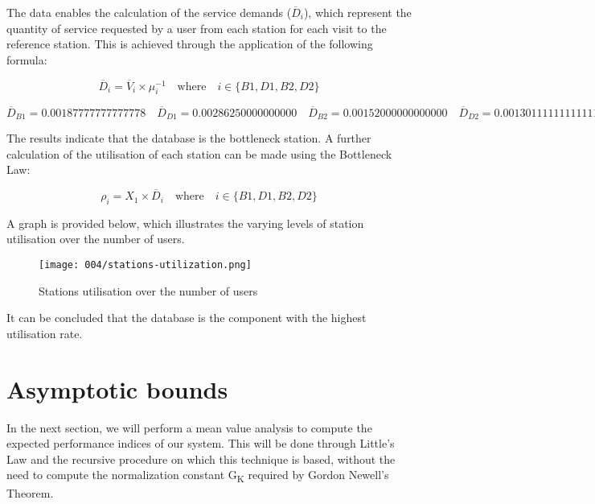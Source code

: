 The data enables the calculation of the service demands ($\overline{D}_i$), which represent the quantity of service requested by a user from each station for each visit to the reference station.
This is achieved through the application of the following formula:

\begin{equation}
	\label{eq:service-demands}
	\overline{D}_i = \overline{V}_i \times \mu^{-1}_i \quad \text{where} \quad i \in \{B1, D1, B2, D2\}
\end{equation}

\[
\overline{D}_{B1} = \num[round-mode=places, round-precision=5]{0.00187777777777778}
\quad
\overline{D}_{D1} = \num[round-mode=places, round-precision=5]{0.00286250000000000}
\quad
\overline{D}_{B2} = \num[round-mode=places, round-precision=5]{0.00152000000000000}
\quad
\overline{D}_{D2} = \num[round-mode=places, round-precision=5]{0.00130111111111111}
\]

The results indicate that the database is the bottleneck station. 
A further calculation of the utilisation of each station can be made using the Bottleneck Law:

\begin{equation}
	\label{eq:bottleneck-law}
	\rho_i = X_1 \times \overline{D}_i \quad \text{where} \quad i \in \{B1, D1, B2, D2\}
\end{equation}

A graph is provided below, which illustrates the varying levels of station utilisation over the number of users.

\begin{figure}[h]
	\centering
	\texttt{[image: 004/stations-utilization.png]}
	\caption{Stations utilisation over the number of users}
\end{figure}

It can be concluded that the database is the component with the highest utilisation rate.

\section{Asymptotic bounds}

In the next section, we will perform a mean value analysis to compute the expected performance indices of our system.
This will be done through Little's Law and the recursive procedure on which this technique is based, without the need to compute the normalization constant G\textsubscript{K} required by Gordon Newell's Theorem.

